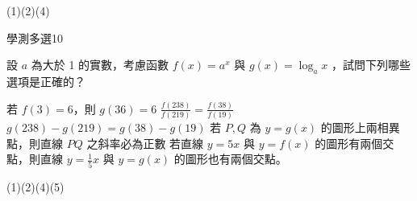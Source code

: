 \begin{QUESTIONS}
\begin{QUESTION}
\begin{QFROMS}
        \end{QFROMS}
        \begin{QTAGS}\end{QTAGS}
        \begin{QANS}
            (1)(2)(4)
        \end{QANS}
        \begin{QSOLLIST}
        \end{QSOLLIST}
        \begin{QEMPTYSPACE}
        \end{QEMPTYSPACE}
    \end{QUESTION}
    \begin{QUESTION}
        \begin{ExamInfo}{96}{學測}{多選}{10}
        \end{ExamInfo}
        \begin{ExamAnsRateInfo}{28}{52}{21}{11}
        \end{ExamAnsRateInfo}
        \begin{QBODY}
            設 $a$ 為大於 1 的實數，考慮函數 $f (x) = a^x$ 與 $g(x) = \log_a x$ ，試問下列哪些選項是正確的？ 
			\begin{QOPS} 
				\QOP 若 $f(3)=6$，則 $g(36)=6$ 
				\QOP $\frac{f (238)}{f(219)} = \frac{f (38)}{ f (19)}$ 
				\QOP $g(238)-g(219)= g(38)-g(19)$ 
				\QOP  若 $P, Q$ 為 $y = g(x)$ 的圖形上兩相異點，則直線 $PQ$ 之斜率必為正數 
				\QOP 若直線 $y=5x$ 與 $y= f(x)$ 的圖形有兩個交點，則直線 $y = \frac{1}{5}x$ 與 $y=g(x)$ 的圖形也有兩個交點。
			\end{QOPS}
        \end{QBODY}
        \begin{QFROMS}
        \end{QFROMS}
        \begin{QTAGS}\end{QTAGS}
        \begin{QANS}
            (1)(2)(4)(5)
        \end{QANS}
        \begin{QSOLLIST}
        \end{QSOLLIST}
        \begin{QEMPTYSPACE}
        \end{QEMPTYSPACE}
    \end{QUESTION}
    \begin{QUESTION}

\end{QUESTION}
\end{QUESTIONS}
